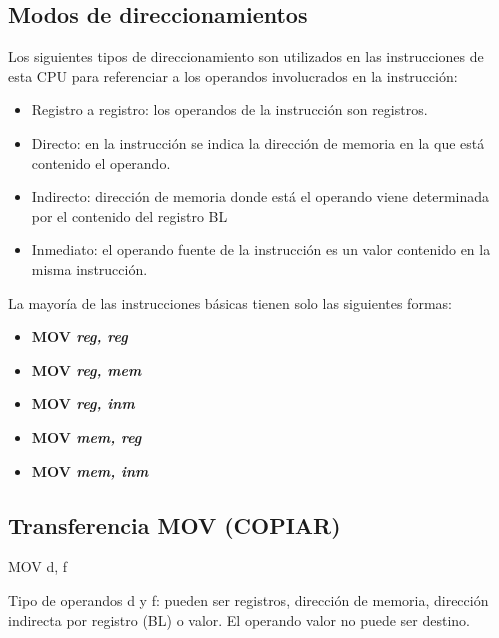 \documentclass[12pt,twoside]{templates/unerthesis}
\providecommand{\tightlist}{%
  \setlength{\itemsep}{0pt}\setlength{\parskip}{0pt}}
\begin{document}
\hypertarget{modos-de-direccionamientos}{%
\subsection{Modos de direccionamientos}\label{modos-de-direccionamientos}}

Los siguientes tipos de direccionamiento son utilizados en las instrucciones de esta CPU para referenciar a los operandos involucrados en la instrucción:

\begin{itemize}
\tightlist
\item
  Registro a registro: los operandos de la instrucción son registros.\\
\item
  Directo: en la instrucción se indica la dirección de memoria en la que está contenido el operando.\\
\item
  Indirecto: dirección de memoria donde está el operando viene determinada por el contenido del registro BL\\
\item
  Inmediato: el operando fuente de la instrucción es un valor contenido en la misma instrucción.
\end{itemize}

La mayoría de las instrucciones básicas tienen solo las siguientes formas:

\begin{itemize}
\tightlist
\item
  \textbf{MOV \emph{reg, reg}}\\
\item
  \textbf{MOV \emph{reg, mem}}\\
\item
  \textbf{MOV \emph{reg, inm}}\\
\item
  \textbf{MOV \emph{mem, reg}}\\
\item
  \textbf{MOV \emph{mem, inm}}
\end{itemize}

\hypertarget{transferencia-mov-copiar}{%
\subsection{Transferencia MOV (COPIAR)}\label{transferencia-mov-copiar}}

MOV d, f

Tipo de operandos d y f: pueden ser registros, dirección de memoria, dirección indirecta por registro (BL) o valor. El operando valor no puede ser destino.
\end{document}
